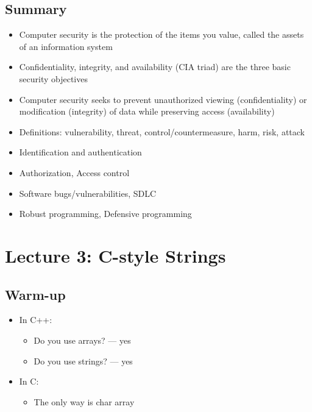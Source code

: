 \documentclass[11pt,a4paper]{article}
\begin{document}
\subsection{Summary}

\begin{itemize}
    \item Computer security is the protection of the items you value, called the assets of an information system
    
    \item Confidentiality, integrity, and availability (CIA triad) are the three basic security objectives
    
    \item Computer security seeks to prevent unauthorized viewing (confidentiality) or modification (integrity) of data while preserving access (availability)
    
    \item Definitions: vulnerability, threat, control/countermeasure, harm, risk, attack
    
    \item Identification and authentication
    
    \item Authorization, Access control
    
    \item Software bugs/vulnerabilities, SDLC
    
    \item Robust programming, Defensive programming
\end{itemize}

\section{Lecture 3: C-style Strings}

\subsection{Warm-up}
\begin{itemize}
    \item In C++:
    \begin{itemize}
        \item Do you use arrays? --- yes
        \item Do you use strings? --- yes
    \end{itemize}
    \item In C:
    \begin{itemize}
        \item The only way is char array
    \end{itemize}
\end{itemize}
\end{document}
